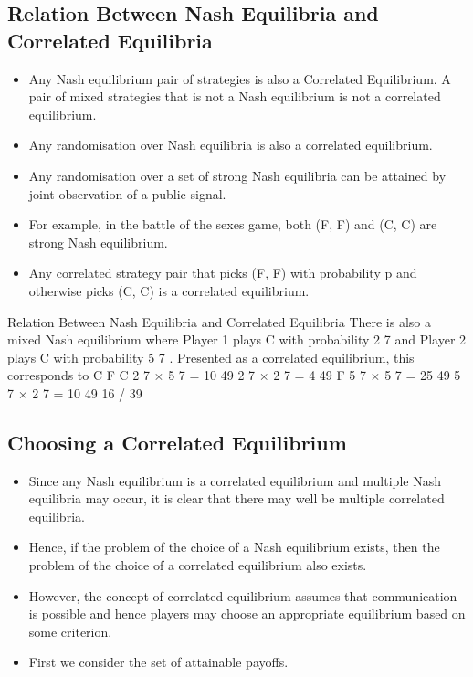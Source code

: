\documentclass[]{report}
\begin{document}
\subsection{Relation Between Nash Equilibria and Correlated Equilibria}
\begin{itemize}
	\item Any Nash equilibrium pair of strategies is also a Correlated
	Equilibrium. A pair of mixed strategies that is not a Nash
	equilibrium is not a correlated equilibrium.
	\item	Any randomisation over Nash equilibria is also a correlated
	equilibrium. 
		\item Any randomisation over a set of strong Nash equilibria
	can be attained by joint observation of a public signal.
	\item	For example, in the battle of the sexes game, both (F, F) and
	(C, C) are strong Nash equilibrium. 
	\item Any correlated strategy pair
	that picks (F, F) with probability p and otherwise picks (C, C) is a
	correlated equilibrium.
\end{itemize}


Relation Between Nash Equilibria and Correlated Equilibria
There is also a mixed Nash equilibrium where Player 1 plays C
with probability 2
7
and Player 2 plays C with probability 5
7
.
Presented as a correlated equilibrium, this corresponds to
C F
C
2
7 ×
5
7 =
10
49
2
7 ×
2
7 =
4
49
F
5
7 ×
5
7 =
25
49
5
7 ×
2
7 =
10
49
16 / 39


\subsection{Choosing a Correlated Equilibrium}
\begin{itemize}
	\item Since any Nash equilibrium is a correlated equilibrium and multiple
	Nash equilibria may occur, it is clear that there may well be
	multiple correlated equilibria.
	\item	Hence, if the problem of the choice of a Nash equilibrium exists,
	then the problem of the choice of a correlated equilibrium also
	exists.
	\item	However, the concept of correlated equilibrium assumes that
	communication is possible and hence players may choose an
	appropriate equilibrium based on some criterion.
		\item First we consider
	the set of attainable payoffs.
\end{itemize}
\end{document}
